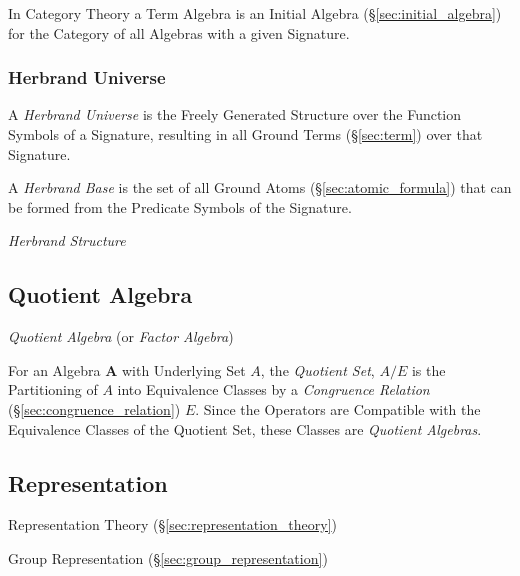 In Category Theory a Term Algebra is an Initial Algebra
(\S\ref{sec:initial_algebra}) for the Category of all Algebras with a
given Signature.



\subsubsection{Herbrand Universe}\label{sec:herbrand_universe}

A \emph{Herbrand Universe} is the Freely Generated Structure over the
Function Symbols of a Signature, resulting in all Ground Terms
(\S\ref{sec:term}) over that Signature.

A \emph{Herbrand Base} is the set of all Ground Atoms
(\S\ref{sec:atomic_formula}) that can be formed from the Predicate
Symbols of the Signature.

\emph{Herbrand Structure}



\subsection{Quotient Algebra}\label{sec:quotient_algebra}

\emph{Quotient Algebra} (or \emph{Factor Algebra})

For an Algebra $\mathbf{A}$ with Underlying Set $A$, the
\emph{Quotient Set}, $A / E$ is the Partitioning of $A$ into
Equivalence Classes by a \emph{Congruence Relation}
(\S\ref{sec:congruence_relation}) $E$. Since the Operators are
Compatible with the Equivalence Classes of the Quotient Set, these
Classes are \emph{Quotient Algebras}.



\subsection{Representation}\label{sec:model_representation}

Representation Theory (\S\ref{sec:representation_theory})

Group Representation (\S\ref{sec:group_representation})





